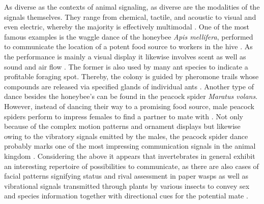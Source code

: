 As diverse as the contexts of animal signaling, as diverse are the modalities of the signals themselves. They range from chemical, tactile, and acoustic to visual and even electric, whereby the majority is effectively multimodal \parencite{bradbury1998principles, seyfarth2010central}. One of the most famous examples is the waggle dance of the honeybee \textit{Apis mellifera}, performed to communicate the location of a potent food source to workers in the hive \parencite{von1965tanze, riley2005flight}. As the performance is mainly a visual display it likewise involves scent \parencite{thom2007scent} as well as sound and air flow \parencite{tsujiuchi2007dynamic}. The former is also used by many ant species to indicate a profitable foraging spot. Thereby, the colony is guided by pheromone trails whose compounds are released via specified glands of individual ants \parencite{sudd1959interaction, david2009trail}. Another type of dance besides the honeybee's can be found in the peacock spider \textit{Maratus volans}. However, instead of dancing their way to a promising food source, male peacock spiders perform to impress females to find a partner to mate with \parencite{girard2011multi}. Not only because of the complex motion patterns and ornament displays but likewise owing to the vibratory signals emitted by the males, the peacock spider dance probably marks one of the most impressing communication signals in the animal kingdom \parencite{girard2011multi}. Considering the above it appears that invertebrates in general exhibit an interesting repertoire of possibilities to communicate, as there are also cases of facial patterns signifying status and rival assessment in paper wasps \parencite{tibbetts2008visual} as well as vibrational signals transmitted through plants by various insects to convey sex and species information together with directional cues for the potential mate \parencite{virant2004vibrational}.

\vspace{\baselineskip}

